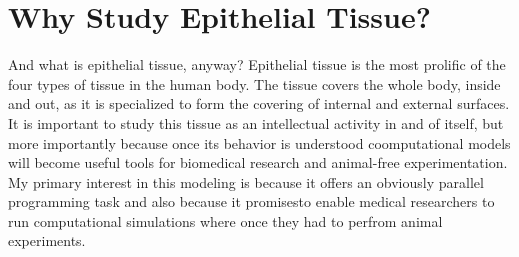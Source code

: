 \chapter{Why Study Epithelial Tissue?}
And what is epithelial tissue, anyway? Epithelial tissue is the most prolific of the four types of tissue in the human body. The tissue covers  the whole body, inside and out, as it is specialized to form the covering of internal and external surfaces. 
It is important to study this tissue as an intellectual activity in and of itself, but more importantly because once its behavior is understood coomputational models will become useful tools for biomedical research and animal-free experimentation.
My primary interest in this modeling is because it offers an obviously parallel programming task and also because it promisesto enable medical researchers to run computational simulations where once  they had to perfrom animal experiments.
